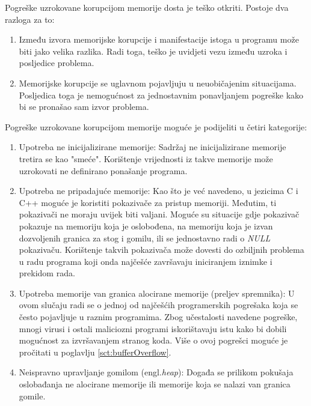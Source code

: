 \documentclass[times, utf8, diplomski, numeric]{fer}
\begin{document}
Pogreške uzrokovane korupcijom memorije dosta je teško otkriti. Postoje dva razloga za to:
\begin{enumerate}
\item Između izvora memorijske korupcije i manifestacije istoga u programu može biti jako velika razlika. Radi toga, teško je uvidjeti vezu između uzroka i posljedice problema.
\item Memorijske korupcije se uglavnom pojavljuju u neuobičajenim situacijama. Posljedica toga je nemogućnost za jednostavnim ponavljanjem pogreške kako bi se pronašao sam izvor problema.
\end{enumerate}
Pogreške uzrokovane korupcijom memorije moguće je podijeliti u četiri kategorije:
\begin{enumerate}
\item Upotreba ne inicijalizirane memorije: Sadržaj ne inicijalizirane memorije tretira se kao "smeće". Korištenje vrijednosti iz takve memorije može uzrokovati ne definirano ponašanje programa.
\item Upotreba ne pripadajuće memorije: Kao što je već navedeno, u jezicima C i C++ moguće je koristiti pokazivače za pristup memoriji. Međutim, ti pokazivači ne moraju uvijek biti valjani. Moguće su situacije gdje pokazivač pokazuje na memoriju koja je oslobođena, na memoriju koja je izvan dozvoljenih granica za stog i gomilu, ili se jednostavno radi o \emph{NULL} pokazivaču. Korištenje takvih pokazivača može dovesti do ozbiljnih problema u radu programa koji onda najčešće završavaju iniciranjem iznimke i prekidom rada.
\item Upotreba memorije van granica alocirane memorije (preljev spremnika): U ovom slučaju radi se o jednoj od najčešćih programerskih pogrešaka koja se često pojavljuje u raznim programima. Zbog učestalosti navedene pogreške, mnogi virusi i ostali maliciozni programi iskorištavaju istu kako bi dobili mogućnost za izvršavanjem stranog koda. Više o ovoj pogrešci moguće je pročitati u poglavlju \ref{sct:bufferOverflow}.
\item Neispravno upravljanje gomilom (engl.\emph{heap}): Događa se prilikom pokušaja oslobađanja ne alocirane memorije ili memorije koja se nalazi van granica gomile. 
\end{enumerate}
\end{document}
